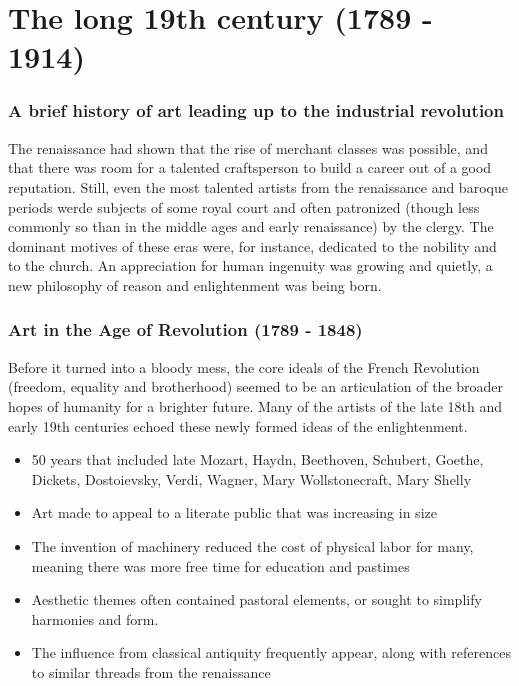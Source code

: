 \documentclass[11pt]{article}
\begin{document}
\section{The long 19th century (1789 - 1914)}
\label{sec:orgcbd93cf}

\subsubsection{A brief history of art leading up to the industrial revolution}
\label{sec:orgc3987de}
The renaissance had shown that the rise of merchant classes was
possible, and that there was room for a talented craftsperson to build
a career out of a good reputation. Still, even the most talented
artists from the renaissance and baroque periods werde subjects of
some royal court and often patronized (though less commonly so than in
the middle ages and early renaissance) by the clergy. The dominant
motives of these eras were, for instance, dedicated to the nobility
and to the church. An appreciation for human ingenuity was growing and
quietly, a new philosophy of reason and enlightenment was being born. 


\subsubsection{Art in the Age of Revolution (1789 - 1848)}
\label{sec:org6424ad1}

Before it turned into a bloody mess, the core ideals of the French
Revolution (freedom, equality and brotherhood) seemed to be an
articulation of the broader hopes of humanity for a brighter future. 
Many of the artists of the late 18th and early 19th centuries echoed
these newly formed ideas of the enlightenment. 

\begin{itemize}
\item 50 years that included late Mozart, Haydn, Beethoven, Schubert, Goethe, Dickets,
Dostoievsky, Verdi, Wagner, Mary Wollstonecraft, Mary Shelly
\item Art made to appeal to a literate public that was increasing in
size
\item The invention of machinery reduced the cost of physical labor for
many, meaning there was more free time for education and pastimes
\item Aesthetic themes often contained pastoral elements, or sought to
simplify harmonies and form.
\item The influence from classical antiquity frequently appear, along with
references to similar threads from the renaissance
\end{itemize}
\end{document}
